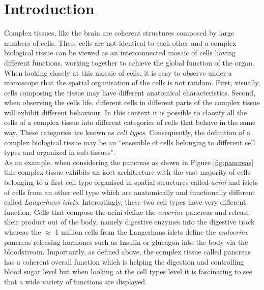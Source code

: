 %
\chapter{Introduction}\label{ch:background}
%
    Complex tissues, like the brain are coherent structures composed by large numbers of cells. These cells are not identical to each other and a complex biological tissue can be viewed as an interconnected mosaic of cells having different functions, working together to achieve the global function of the organ. When looking closely at this mosaic of cells, it is easy to observe under a microscope \cite{young13} that the spatial organisation of the cells is not random. First, visually, cells composing the tissue may have different anatomical characteristics. Second, when observing the cells life, different cells in different parts of the complex tissue will exhibit different behaviour. In this context it is possible to classify all the cells of a complex tissue into different categories of cells that behave in the same way. These categories are known as \emph{cell types}. Consequently, the definition of a complex biological tissue may be an ``ensemble of cells belonging to different cell types and organized in sub-tissues".\\
    
     As an example, when considering the pancreas as shown in Figure \ref{fig:pancreas} this complex tissue exhibits an islet architecture \cite{brissova05} with the vast majority of cells belonging to a first cell type organised in spatial structures called \emph{acini} and islets of cells from an other cell type which are anatomically and functionally different called \emph{Langerhans islets}. Interestingly, these two cell types have very different function. Cells that compose the acini define the \emph{exocrine} pancreas and release their product out of the body, namely digestive enzymes into the digestive track \cite{rodriguez11} whereas the $\approx$ 1 million cells \cite{hellman09} from the Langerhans islets define the \emph{endocrine} pancreas releasing hormones such as Insulin or glucagon into the body via the bloodstream. Importantly, as defined above, the complex tissue called pancreas has a coherent overall function which is helping the digestion and controlling blood sugar level but when looking at the cell types level it is fascinating to see that a wide variety of functions are displayed.\\
     
